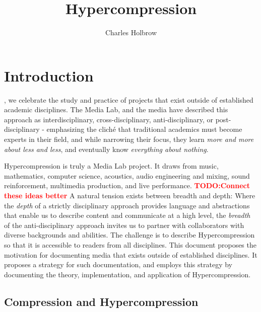 \documentclass{tufte-book}
\title{Hypercompression}
\author{Charles Holbrow}
\newcommand{\TODO}[1]{\textcolor{red}{\bf TODO:#1}\xspace}
\newcommand{\thesis}{Hypercompression\xspace}
\begin{document}
\frontmatter

\maketitle

\tableofcontents

\mainmatter

\cleardoublepage
\chapter{Introduction}
\label{ch:introduction}

\begin{fullwidth}
  , we celebrate the study and practice
  of projects that exist outside of established academic
  disciplines. The Media Lab, and the media have described this
  approach as interdisciplinary, cross-disciplinary,
  anti-disciplinary, or post-disciplinary - emphasizing the clich\'{e}
  that traditional academics must become experts in their field,
  and while narrowing their focus, they learn \textit{more and more
    about less and less}, and eventually know \textit{everything about
    nothing}.
\end{fullwidth}

\thesis is truly a Media Lab project. It draws from
music, mathematics, computer science, acoustics, audio engineering and
mixing, sound reinforcement, multimedia production, and live
performance. \TODO{Connect these ideas better} A natural tension exists between breadth and depth: Where
the \textit{depth} of a strictly disciplinary approach provides
language and abstractions that enable us to describe content and
communicate at a high level, the \textit{breadth} of the anti-disciplinary
approach invites us to partner with collaborators with diverse
backgrounds and abilities. The challenge is to describe \thesis so
that it is accessible to readers from all disciplines. This document
proposes the motivation for documenting media that exists outside of
established disciplines. It proposes a strategy for such
documentation, and employs this strategy by documenting the theory,
implementation, and application of \thesis.

\section{Compression and Hypercompression}
\label{sec:compression-and-hypercompression}
\end{document}
